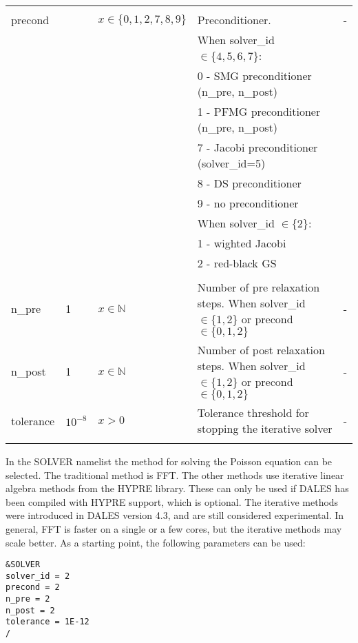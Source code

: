 \documentclass[twoside,11pt,fleqn,a4paper,english,openright]{report}
\begin{document}
\begin{center}
\begin{supertabular}{|l|p{2cm}|p{4cm}|p{6cm}|l|}
  	&&&&\\
  precond       &          &  $x \in \{0,1,2,7,8,9\}$  & Preconditioner.& -\\
  & & & When solver\_id $\in \{ 4,5,6,7 \}$: & \\ 
  & & & 0 - SMG preconditioner (n\_pre, n\_post) & \\
  & & & 1 - PFMG preconditioner (n\_pre, n\_post) & \\
  & & & 7 - Jacobi preconditioner  (solver\_id=5) & \\
  & & & 8 - DS preconditioner  & \\
  & & & 9 - no preconditioner & \\
  & & & When solver\_id $\in \{ 2 \}$: & \\ 
  & & & 1 - wighted Jacobi  & \\ %
  & & & 2 - red-black GS & \\  %
  &&&&\\
  n\_pre        & 1        &  $x \in \mathbb{N}$     & Number of pre relaxation steps. When solver\_id $\in \{1,2\}$ or precond $\in \{0,1,2 \}$ & -\\
  n\_post       & 1        &  $x \in \mathbb{N}$     & Number of post relaxation steps. When solver\_id $\in \{1,2\}$ or precond $\in \{0,1,2 \}$ & -\\
  tolerance     & $10^{-8}$ &  $x > 0 $               & Tolerance threshold for stopping the iterative solver& -\\
  & & & &\\
 
\end{supertabular}
\end{center}

In the SOLVER namelist the method for solving the Poisson equation can be selected. The traditional method is FFT.
The other methods use iterative linear algebra methods from the HYPRE library. These can only be used if
DALES has been compiled with HYPRE support, which is optional. The iterative methods were introduced in DALES
version 4.3, and are still considered experimental. In general, FFT is faster on a single or a few cores,
but the iterative methods may scale better. As a starting point, the following parameters can be used:
\begin{verbatim}
&SOLVER
solver_id = 2
precond = 2
n_pre = 2
n_post = 2
tolerance = 1E-12
/
\end{verbatim}





\end{document}
